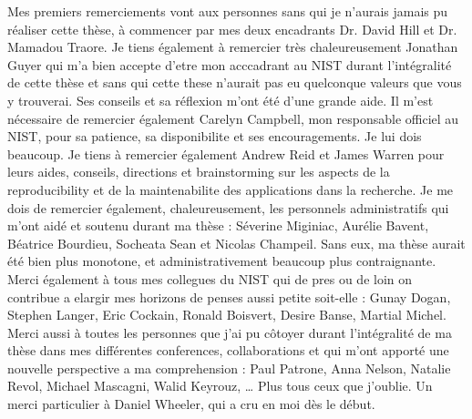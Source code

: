 
\begin{acknowledgements}      


Mes premiers remerciements vont aux personnes sans qui je n’aurais jamais pu réaliser cette thèse, à commencer par mes deux encadrants Dr. David Hill et Dr. Mamadou Traore. Je tiens également à remercier très chaleureusement Jonathan Guyer qui m’a bien accepte d’etre mon acccadrant au NIST durant l’intégralité de cette thèse et sans qui cette these n’aurait pas eu quelconque valeurs que vous y trouverai. Ses conseils et sa réflexion m’ont été d’une grande aide. Il m’est nécessaire de remercier également Carelyn Campbell, mon responsable officiel au NIST, pour sa patience, sa disponibilite et ses encouragements. Je lui dois beaucoup.
Je tiens à remercier également Andrew Reid et James Warren pour leurs aides, conseils, directions et brainstorming sur les aspects de la reproducibility et de la maintenabilite des applications dans la recherche.
Je me dois de remercier également, chaleureusement, les personnels administratifs qui m’ont aidé et soutenu durant ma thèse : Séverine Miginiac, Aurélie Bavent, Béatrice Bourdieu, Socheata Sean et Nicolas Champeil. Sans eux, ma thèse aurait été bien plus monotone, et administrativement beaucoup plus contraignante.
Merci également à tous mes collegues du NIST qui de pres ou de loin on contribue a elargir mes horizons de penses aussi petite soit-elle : Gunay Dogan, Stephen Langer, Eric Cockain, Ronald Boisvert, Desire Banse, Martial Michel.
Merci aussi à toutes les personnes que j’ai pu côtoyer durant l’intégralité de ma thèse dans mes différentes conferences, collaborations et qui m’ont apporté une nouvelle perspective a ma comprehension : Paul Patrone, Anna Nelson, Natalie Revol, Michael Mascagni, Walid Keyrouz, … Plus tous ceux que j’oublie.
Un merci particulier à Daniel Wheeler, qui a cru en moi dès le début.



\end{acknowledgements}
